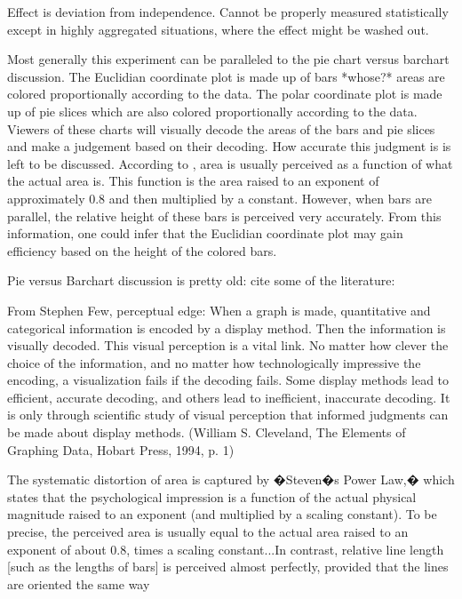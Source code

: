 Effect is deviation from independence. Cannot be properly measured statistically except in highly aggregated situations, where the effect might be washed out.

Most generally this experiment can be paralleled to the pie chart versus barchart discussion. The Euclidian coordinate plot is made up of bars *whose?* areas are colored proportionally according to the data. The polar coordinate plot is made up of pie slices which are also colored proportionally according to the data. Viewers of these charts will visually decode the areas of the bars and pie slices and make a judgement based on their decoding. How accurate this judgment is is left to be discussed. According to  \citet[page=40]{kosslyn:2006}, area is usually perceived as a function of what the actual area is. This function is the area raised to an exponent of approximately 0.8 and then multiplied by a constant. However, when bars are parallel, the relative height of these bars is perceived very accurately. From this information, one could infer that the Euclidian coordinate plot may gain efficiency based on the height of the colored bars. 


Pie versus Barchart discussion is pretty old: cite some of the literature:

From Stephen Few, perceptual edge:
	When a graph is made, quantitative and categorical information is encoded by a display method. Then the information is visually decoded. This visual perception is a vital link. No matter how clever the choice of the information, and no matter how technologically impressive the encoding, a visualization fails if the decoding fails. Some display methods lead to efficient, accurate decoding, and others lead to inefficient, inaccurate decoding. It is only through scientific study of visual perception that informed judgments can be made about display methods. (William S. Cleveland, The Elements of Graphing Data, Hobart Press, 1994, p. 1)
	
	The systematic distortion of area is captured by �Steven�s Power Law,� which states that the psychological impression is a function of the actual physical magnitude raised to an exponent (and multiplied by a scaling constant). To be precise, the perceived area is usually equal to the actual area raised to an exponent of about 0.8, times a scaling constant...In contrast, relative line length [such as the lengths of bars] is perceived almost perfectly, provided that the lines are oriented the same way \cite[page=40]{kosslyn:2006}
	
